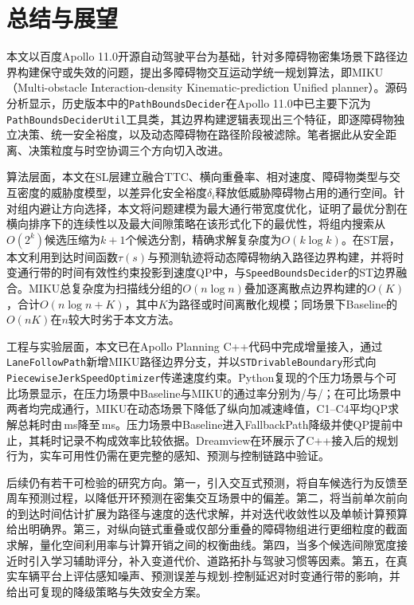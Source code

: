 \chapter{总结与展望}
\label{chap:conclusion}

本文以百度Apollo 11.0开源自动驾驶平台为基础，针对多障碍物密集场景下路径边界构建保守或失效的问题，提出多障碍物交互运动学统一规划算法，即MIKU（Multi-obstacle Interaction-density Kinematic-prediction Unified planner）。源码分析显示，历史版本中的\texttt{PathBoundsDecider}在Apollo 11.0中已主要下沉为\texttt{PathBoundsDeciderUtil}工具类，其边界构建逻辑表现出三个特征，即逐障碍物独立决策、统一安全裕度，以及动态障碍物在路径阶段被滤除。笔者据此从安全距离、决策粒度与时空协调三个方向切入改进。

算法层面，本文在SL层建立融合TTC、横向重叠率、相对速度、障碍物类型与交互密度的威胁度模型，以差异化安全裕度$\delta_i$释放低威胁障碍物占用的通行空间。针对组内避让方向选择，本文将问题建模为最大通行带宽度优化，证明了最优分割在横向排序下的连续性以及最大间隙策略在该形式化下的最优性，将组内搜索从$O(2^k)$候选压缩为$k+1$个候选分割，精确求解复杂度为$O(k \log k)$。在ST层，本文利用到达时间函数$\tau(s)$与预测轨迹将动态障碍物纳入路径边界构建，并将时变通行带的时间有效性约束投影到速度QP中，与\texttt{SpeedBoundsDecider}的ST边界融合。MIKU总复杂度为扫描线分组的$O(n\log n)$叠加逐离散点边界构建的$O(K)$，合计$O(n\log n + K)$，其中$K$为路径或时间离散化规模；同场景下Baseline的$O(nK)$在$n$较大时劣于本文方法。

工程与实验层面，本文已在Apollo Planning C++代码中完成增量接入，通过\texttt{LaneFollowPath}新增MIKU路径边界分支，并以\texttt{STDrivableBoundary}形式向\texttt{PiecewiseJerkSpeedOptimizer}传递速度约束。Python复现的\MPressureScenarioTotal{}个压力场景与\MComparableScenarioTotal{}个可比场景显示，在压力场景中Baseline与MIKU的通过率分别为\MPressureBaselinePassCount{}/\MPressureScenarioTotal{}与\MPressureMikuPassCount{}/\MPressureScenarioTotal{}；在可比场景中两者均完成通行，MIKU在动态场景下降低了纵向加减速峰值，C1--C4平均QP求解总耗时由\MComparableBaselineQpTotal\,ms降至\MComparableMikuQpTotal\,ms。压力场景中Baseline进入FallbackPath降级并使QP提前中止，其耗时记录不构成效率比较依据。Dreamview在环展示了C++接入后的规划行为，实车可用性仍需在更完整的感知、预测与控制链路中验证。

后续仍有若干可检验的研究方向。第一，引入交互式预测，将自车候选行为反馈至周车预测过程，以降低开环预测在密集交互场景中的偏差。第二，将当前单次前向的到达时间估计扩展为路径与速度的迭代求解，并对迭代收敛性以及单帧计算预算给出明确界。第三，对纵向链式重叠或仅部分重叠的障碍物组进行更细粒度的截面求解，量化空间利用率与计算开销之间的权衡曲线。第四，当多个候选间隙宽度接近时引入学习辅助评分，补入变道代价、道路拓扑与驾驶习惯等因素。第五，在真实车辆平台上评估感知噪声、预测误差与规划-控制延迟对时变通行带的影响，并给出可复现的降级策略与失效安全方案。

